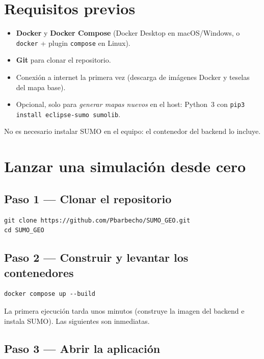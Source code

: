 \documentclass[11pt,a4paper]{article}
\begin{document}
\section{Requisitos previos}

\begin{itemize}
  \item \textbf{Docker} y \textbf{Docker Compose} (Docker Desktop en macOS/Windows,
        o \texttt{docker} + plugin \texttt{compose} en Linux).
  \item \textbf{Git} para clonar el repositorio.
  \item Conexión a internet la primera vez (descarga de imágenes Docker y teselas
        del mapa base).
  \item Opcional, solo para \emph{generar mapas nuevos} en el host:
        Python~3 con \texttt{pip3 install eclipse-sumo sumolib}.
\end{itemize}

No es necesario instalar SUMO en el equipo: el contenedor del backend lo incluye.

\section{Lanzar una simulación desde cero}

\subsection{Paso 1 --- Clonar el repositorio}

\begin{lstlisting}
git clone https://github.com/Pbarbecho/SUMO_GEO.git
cd SUMO_GEO
\end{lstlisting}

\subsection{Paso 2 --- Construir y levantar los contenedores}

\begin{lstlisting}
docker compose up --build
\end{lstlisting}

La primera ejecución tarda unos minutos (construye la imagen del backend e
instala SUMO). Las siguientes son inmediatas.

\subsection{Paso 3 --- Abrir la aplicación}
\end{document}
